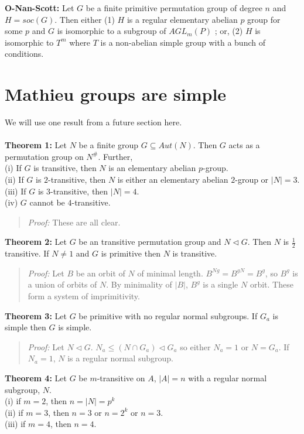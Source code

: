 {\bf O-Nan-Scott:}  Let $G$ be a finite primitive permutation group of degree $n$ and
$H=soc(G)$.  Then either (1) $H$ is a regular elementary abelian $p$ group for
some $p$ and $G$ is isomorphic to a subgroup of
$AGL_m(P)$ ; or, (2) $H$ is isomorphic to $T^m$ where $T$ is a non-abelian simple group
with a bunch of conditions.
\section {Mathieu groups are simple}
We will use one result from a future section here.
\\
\\
{\bf Theorem 1:} 
Let $N$ be a finite group $G \subseteq Aut(N)$.  Then $G$ acts as a permutation group on $N^{\#}$.  Further, \\
(i) If $G$ is transitive, then $N$ is an elementary abelian $p$-group.
\\
(ii) If $G$ is $2$-transitive, then $N$ is either an elementary abelian $2$-group or $|N|=3$.
\\
(iii) If $G$ is $3$-transitive, then $|N|=4$.
\\
(iv) $G$ cannot be $4$-transitive.
\\
\begin{quote}
\emph{Proof:}  These are all clear.
\end{quote}
{\bf Theorem 2:} 
Let $G$ be an transitive permutation group and $N \lhd G$.  Then $N$ is ${\frac 1 2}$ transitive.  If
$N \ne 1$ and $G$ is primitive then $N$ is transitive.
\begin{quote}
\emph{Proof:}
Let $B$ be an orbit of $N$ of minimal length. $B^{Ng}= B^{gN} = B^g$, so $B^g$ is a union of orbits of $N$.
By minimality of $|B|$, $B^g$ is a single $N$ orbit.  These form a system of imprimitivity.
\end{quote}
{\bf Theorem 3:} 
Let $G$ be primitive with no regular normal subgroups.  If $G_a$ is simple then $G$ is simple.
\begin{quote}
\emph{Proof:}
Let $N \lhd G$.  $N_a \leq (N \cap G_a) \lhd G_a$ so either $N_a =1$ or $N=G_a$.  If $N_a=1$, $N$
is a regular normal subgroup.
\end{quote}
{\bf Theorem 4:} 
Let $G$ be $m$-transitive on $A$, $|A|=n$ with a regular normal subgroup, $N$.\\
(i) if $m=2$, then $n = |N|= p^k$
\\
(ii) if $m=3$, then $n = 3$ or $n = 2^k$ or $n = 3$.
\\
(iii) if $m=4$, then $n = 4$.
\\
